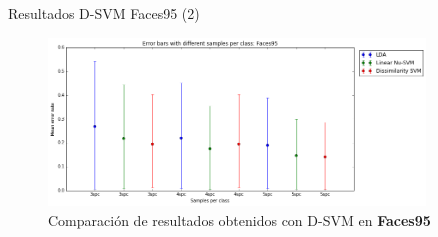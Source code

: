 \documentclass{beamer}
\begin{document}
\begin{frame}{Resultados D-SVM Faces95 (2)}
\begin{figure}[htpb!]
\centering
\includegraphics[width=10cm]{dsvm_rescomp95}
\caption{Comparación de resultados obtenidos con D-SVM en \textbf{Faces95}}
\end{figure}
\end{frame}





    
    

 
    

\end{document}
